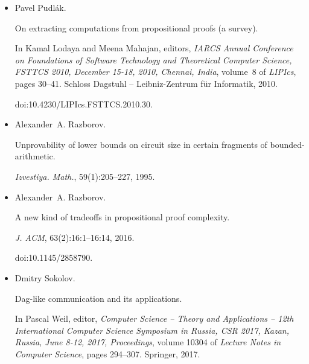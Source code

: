 \documentclass[10pt,a4paper]{article}
\begin{document}
\begin{itemize}
Noam Nisan and Avi Wigderson.


Rounds in communication complexity revisited.


\emph{SIAM J. Comput.}, 22(1):211–219, 1993.


doi:10.1137/0222016.





\item[] 
[22]

Pavel Pudlák.


On extracting computations from propositional proofs (a survey).


In Kamal Lodaya and Meena Mahajan, editors, \emph{IARCS Annual
Conference on Foundations of Software Technology and Theoretical Computer
Science, FSTTCS 2010, December 15-18, 2010, Chennai, India}, volume 8 of
\emph{LIPIcs}, pages 30–41. Schloss Dagstuhl – Leibniz-Zentrum für
Informatik, 2010.


doi:10.4230/LIPIcs.FSTTCS.2010.30.





\item[] 
[23]

Alexander A. Razborov.


Unprovability of lower bounds on circuit size in certain fragments of
bounded-arithmetic.


\emph{Izvestiya. Math.}, 59(1):205–227, 1995.





\item[] 
[24]

Alexander A. Razborov.


A new kind of tradeoffs in propositional proof complexity.


\emph{J. ACM}, 63(2):16:1–16:14, 2016.


doi:10.1145/2858790.





\item[] 
[25]

Dmitry Sokolov.


Dag-like communication and its applications.


In Pascal Weil, editor, \emph{Computer Science – Theory and
Applications – 12th International Computer Science Symposium in Russia,
CSR 2017, Kazan, Russia, June 8-12, 2017, Proceedings}, volume 10304 of
\emph{Lecture Notes in Computer Science}, pages 294–307. Springer, 2017.



\end{itemize}
\end{document}
